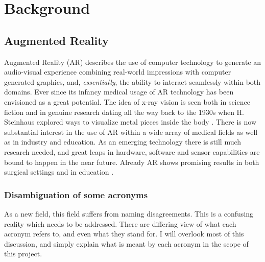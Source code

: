 


\chapter{Background}


\section{Augmented Reality}


Augmented Reality (AR) describes the use of computer technology to generate an audio-visual experience combining real-world impressions with computer generated graphics, and, \textit{essentially}, the ability to interact seamlessly within both domains. Ever since its infancy medical usage of AR technology has been envisioned as a great potential. The idea of x-ray vision is seen both in science fiction and in genuine research dating all the way back to the 1930s when H. Steinhaus explored ways to visualize metal pieces inside the body \citep{Sielhorst2008}. There is now substantial interest in the use of AR within a wide array of medical fields as well as in industry and education. As an emerging technology there is still much research needed, and great leaps in hardware, software and sensor capabilities are bound to happen in the near future. Already AR shows promising results in both surgical settings and in education \citep{Singh2013}.


\subsection*{Disambiguation of some acronyms}\label{chap:armrxr}
As a new field, this field suffers from naming disagreements. This is a confusing reality which needs to be addressed. There are differing view of what each acronym refers to, and even what they stand for. I will overlook most of this discussion, and simply explain what is meant by each acronym in the scope of this project.

